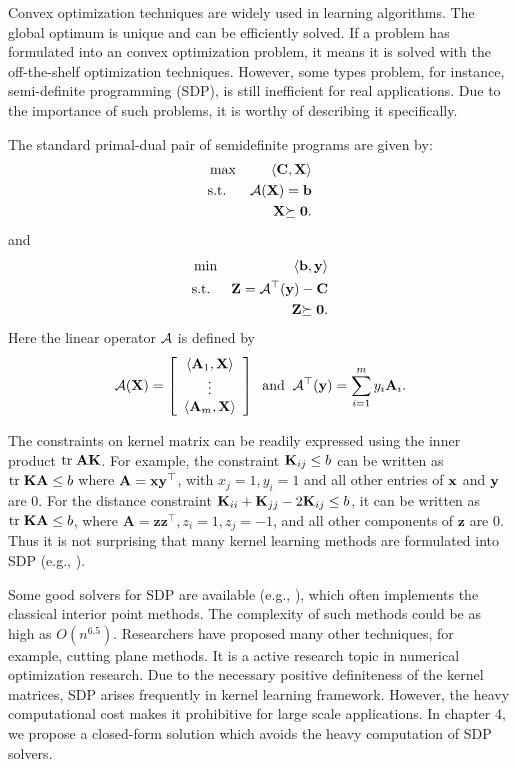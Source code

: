Convex optimization techniques are widely used in learning algorithms. The global optimum is unique and can be efficiently solved. If a problem has formulated into an convex optimization problem, it means it is solved with the off-the-shelf optimization techniques. However, some types problem, for instance, semi-definite programming (SDP), is still inefficient for real applications. Due to the importance of such problems, it is worthy of describing it specifically.

The standard primal-dual pair of semidefinite programs are given by:
\begin{eqnarray}
&\max& \langle\mathbf C,\mathbf X\rangle \nonumber\\
&\mbox{s.t.}& \cal A(\mathbf X)=\mathbf b \nonumber\\
&& \mathbf X{\succeq{\mathbf 0}} .
\end{eqnarray}
and
\begin{eqnarray}
&\min& \langle \mathbf b,\mathbf{y} \rangle \nonumber\\
&\mbox{s.t.}& \mathbf Z={\cal A}^\top(\mathbf{y})-\mathbf C\nonumber\\
&& \mathbf Z{\succeq{\mathbf 0}}.
\end{eqnarray}
Here the linear operator $\cal A$ is defined by
\begin{eqnarray}
{\cal A}(\mathbf X)=\left[
\begin{array}{cl}
\langle\mathbf A_1,\mathbf X\rangle     \\
\vdots                                    \\
\langle\mathbf A_m,\mathbf X\rangle
\end{array}
\right]\;\;\mbox{and}\;\;{\mathcal A}^\top(\mathbf{y})=\sum_{i=1}^{m} y_i \mathbf A_i.
\end{eqnarray}

The constraints on kernel matrix can be readily expressed using the inner product ${\mbox{tr}\;} \mathbf A\mathbf K$. For example, the constraint ${\mathbf K}_{ij}\leq b$ can be written as ${\mbox{tr}\;} {\mathbf K}\mathbf A\leq b$ where $\mathbf A=\mathbf{x}\mathbf{y}^\top$, with $x_j=1,y_i=1$ and all other entries of $\mathbf{x}$ and $\mathbf{y}$ are 0. For the distance constraint ${\mathbf K}_{ii}+{\mathbf K}_{jj}-2{\mathbf K}_{ij}\leq b$, it can be written as ${\mbox{tr}\;} {\mathbf K}\mathbf A\leq b$, where $\mathbf A=\mathbf z\mathbf z^\top, z_i=1,z_j=-1$, and all other components of $\mathbf z$ are 0. Thus it is not surprising that many kernel learning methods are formulated into SDP (e.g., \cite{icml/LanckrietCBGJ02,icml/HoiJL07}).

Some good solvers for SDP are available  (e.g., \cite{oms/Sturm99}), which often implements the classical interior point methods. The complexity of such methods could be as high as $O(n^{6.5})$. Researchers have proposed many other techniques, for example, cutting plane methods\cite{siamjo/HelmbergR00,oms/KrishynanM06}. It is a active research topic in numerical optimization research. Due to the necessary positive definiteness of the kernel matrices, SDP arises frequently in kernel learning framework. However, the heavy computational cost makes it prohibitive for large scale applications. In chapter 4, we propose a closed-form solution which avoids the heavy computation of SDP solvers.

